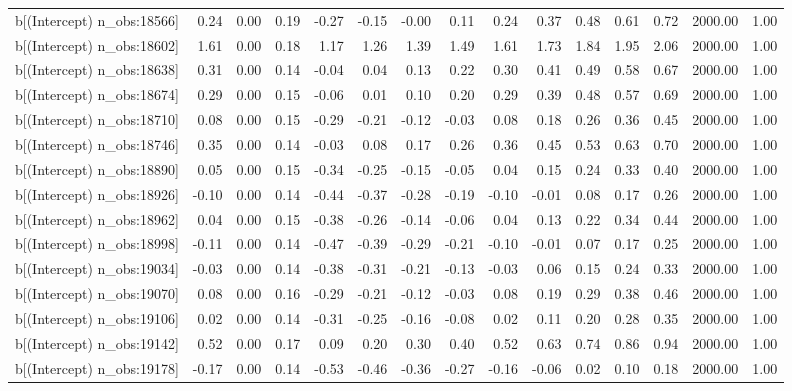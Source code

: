 \begin{table}[ht]
\begin{tabular}{rrrrrrrrrrrrrrr}
  b[(Intercept) n\_obs:18566] & 0.24 & 0.00 & 0.19 & -0.27 & -0.15 & -0.00 & 0.11 & 0.24 & 0.37 & 0.48 & 0.61 & 0.72 & 2000.00 & 1.00 \\ 
  b[(Intercept) n\_obs:18602] & 1.61 & 0.00 & 0.18 & 1.17 & 1.26 & 1.39 & 1.49 & 1.61 & 1.73 & 1.84 & 1.95 & 2.06 & 2000.00 & 1.00 \\ 
  b[(Intercept) n\_obs:18638] & 0.31 & 0.00 & 0.14 & -0.04 & 0.04 & 0.13 & 0.22 & 0.30 & 0.41 & 0.49 & 0.58 & 0.67 & 2000.00 & 1.00 \\ 
  b[(Intercept) n\_obs:18674] & 0.29 & 0.00 & 0.15 & -0.06 & 0.01 & 0.10 & 0.20 & 0.29 & 0.39 & 0.48 & 0.57 & 0.69 & 2000.00 & 1.00 \\ 
  b[(Intercept) n\_obs:18710] & 0.08 & 0.00 & 0.15 & -0.29 & -0.21 & -0.12 & -0.03 & 0.08 & 0.18 & 0.26 & 0.36 & 0.45 & 2000.00 & 1.00 \\ 
  b[(Intercept) n\_obs:18746] & 0.35 & 0.00 & 0.14 & -0.03 & 0.08 & 0.17 & 0.26 & 0.36 & 0.45 & 0.53 & 0.63 & 0.70 & 2000.00 & 1.00 \\ 
  b[(Intercept) n\_obs:18890] & 0.05 & 0.00 & 0.15 & -0.34 & -0.25 & -0.15 & -0.05 & 0.04 & 0.15 & 0.24 & 0.33 & 0.40 & 2000.00 & 1.00 \\ 
  b[(Intercept) n\_obs:18926] & -0.10 & 0.00 & 0.14 & -0.44 & -0.37 & -0.28 & -0.19 & -0.10 & -0.01 & 0.08 & 0.17 & 0.26 & 2000.00 & 1.00 \\ 
  b[(Intercept) n\_obs:18962] & 0.04 & 0.00 & 0.15 & -0.38 & -0.26 & -0.14 & -0.06 & 0.04 & 0.13 & 0.22 & 0.34 & 0.44 & 2000.00 & 1.00 \\ 
  b[(Intercept) n\_obs:18998] & -0.11 & 0.00 & 0.14 & -0.47 & -0.39 & -0.29 & -0.21 & -0.10 & -0.01 & 0.07 & 0.17 & 0.25 & 2000.00 & 1.00 \\ 
  b[(Intercept) n\_obs:19034] & -0.03 & 0.00 & 0.14 & -0.38 & -0.31 & -0.21 & -0.13 & -0.03 & 0.06 & 0.15 & 0.24 & 0.33 & 2000.00 & 1.00 \\ 
  b[(Intercept) n\_obs:19070] & 0.08 & 0.00 & 0.16 & -0.29 & -0.21 & -0.12 & -0.03 & 0.08 & 0.19 & 0.29 & 0.38 & 0.46 & 2000.00 & 1.00 \\ 
  b[(Intercept) n\_obs:19106] & 0.02 & 0.00 & 0.14 & -0.31 & -0.25 & -0.16 & -0.08 & 0.02 & 0.11 & 0.20 & 0.28 & 0.35 & 2000.00 & 1.00 \\ 
  b[(Intercept) n\_obs:19142] & 0.52 & 0.00 & 0.17 & 0.09 & 0.20 & 0.30 & 0.40 & 0.52 & 0.63 & 0.74 & 0.86 & 0.94 & 2000.00 & 1.00 \\ 
  b[(Intercept) n\_obs:19178] & -0.17 & 0.00 & 0.14 & -0.53 & -0.46 & -0.36 & -0.27 & -0.16 & -0.06 & 0.02 & 0.10 & 0.18 & 2000.00 & 1.00 \\ 

\end{tabular}
\end{table}
